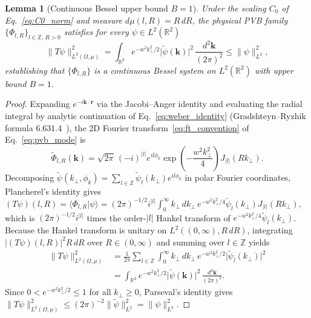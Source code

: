 \documentclass[aps,pra,reprint,amsmath,amssymb,floatfix,longbibliography]{revtex4-2}
\providecommand{\braket}[2]{\langle#1\vert#2\rangle}
\providecommand{\abs}[1]{\lvert#1\rvert}
\providecommand{\norm}[1]{\lVert#1\rVert}
\newtheorem{lemma}{Lemma}
\begin{document}
\begin{lemma}[Continuous Bessel upper bound $B=1$]
\label{lem:bessel_upper}
Under the scaling $C_0$ of Eq.~\eqref{eq:C0_norm} and measure $d\mu(l,R) = R\,dR$, the physical PVB family $\{\Phi_{l,R}\}_{l\in\mathbb{Z},\,R>0}$ satisfies for every $\psi \in L^2(\mathbb{R}^2)$
\begin{equation}
\norm{T\psi}_{L^2(\Omega,\mu)}^2 = \int_{\mathbb{R}^2} e^{-w^2 k_\perp^2/2}\abs{\widetilde{\psi}(\mathbf{k})}^2\,\frac{d^2\mathbf{k}}{(2\pi)^2} \le \norm{\psi}_{L^2}^2,
\label{eq:bessel_lemma}
\end{equation}
establishing that $\{\Phi_{l,R}\}$ is a continuous Bessel system on $L^2(\mathbb{R}^2)$ with upper bound $B = 1$.
\end{lemma}
\begin{proof}
Expanding $e^{-i\mathbf{k}\cdot\mathbf{r}}$ via the Jacobi--Anger identity and evaluating the radial integral by analytic continuation of Eq.~\eqref{eq:weber_identity} (Gradshteyn--Ryzhik formula 6.631.4~\cite{Gradshteyn2014}), the 2D Fourier transform~\eqref{eq:ft_convention} of Eq.~\eqref{eq:pvb_mode} is
\begin{equation}
\widetilde{\Phi}_{l,R}(\mathbf{k}) = \sqrt{2\pi}\,(-i)^{\abs{l}} e^{il\phi_k} \exp\!\left(-\frac{w^2 k_\perp^2}{4}\right) J_{\abs{l}}(R k_\perp).
\label{eq:pvb_ft}
\end{equation}
Decomposing $\widetilde{\psi}(k_\perp,\phi_k) = \sum_{l\in\mathbb{Z}} \widetilde{\psi}_l(k_\perp)e^{il\phi_k}$ in polar Fourier coordinates, Plancherel's identity gives $(T\psi)(l,R) = \braket{\Phi_{l,R}}{\psi} = (2\pi)^{-1/2} i^{\abs{l}} \allowbreak \int_0^\infty k_\perp\,dk_\perp\, \allowbreak e^{-w^2 k_\perp^2/4}\widetilde{\psi}_l(k_\perp) J_{\abs{l}}(Rk_\perp)$, which is $(2\pi)^{-1/2} i^{\abs{l}}$ times the order-$\abs{l}$ Hankel transform of $e^{-w^2 k_\perp^2/4}\widetilde{\psi}_l(k_\perp)$. Because the Hankel transform is unitary on $L^2((0,\infty), R\,dR)$, integrating $\abs{(T\psi)(l,R)}^2 R\,dR$ over $R \in (0,\infty)$ and summing over $l \in \mathbb{Z}$ yields
\begin{align*}
\norm{T\psi}_{L^2(\Omega,\mu)}^2 &= \frac{1}{2\pi}\sum_{l\in\mathbb{Z}} \int_0^\infty k_\perp\,dk_\perp\,e^{-w^2 k_\perp^2/2}\abs{\widetilde{\psi}_l(k_\perp)}^2 \\
&= \int_{\mathbb{R}^2} e^{-w^2 k_\perp^2/2}\abs{\widetilde{\psi}(\mathbf{k})}^2\,\frac{d^2\mathbf{k}}{(2\pi)^2}.
\end{align*}
Since $0 < e^{-w^2 k_\perp^2/2} \le 1$ for all $k_\perp \ge 0$, Parseval's identity gives $\norm{T\psi}_{L^2(\Omega,\mu)}^2 \le (2\pi)^{-2}\norm{\widetilde{\psi}}_{L^2}^2 = \norm{\psi}_{L^2}^2$.
\end{proof}
\end{document}
